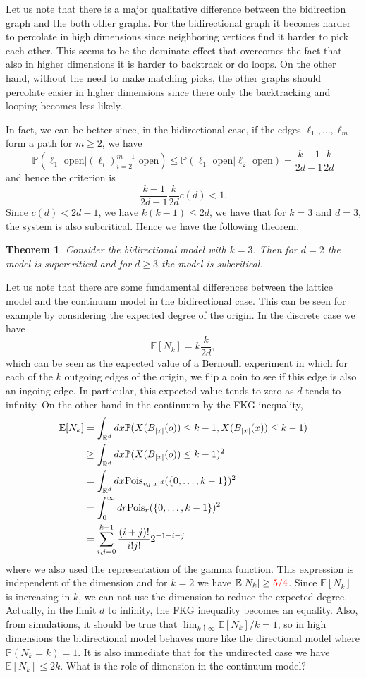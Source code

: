 \documentclass{article}
\newtheorem{theorem}{Theorem}[section]
\theoremstyle{definition}
\newcommand{\1}{\mathbbm{1}}
\newcommand{\0}{\mathbf{o}}
\begin{document}
Let us note that there is a major qualitative difference between the bidirection graph and the both other graphs. For the bidirectional graph it becomes harder to percolate in high dimensions since neighboring vertices find it harder to pick each other. This seems to be the dominate effect that overcomes the fact that also in higher dimensions it is harder to backtrack or do loops. On the other hand, without the need to make matching picks, the other graphs should percolate easier in higher dimensions since there only the backtracking and looping becomes less likely. 

In fact, we can be better since, in the bidirectional case, if the edges $\ell_1,\ldots,\ell_m$ form a path for $m \geq 2$, we have
$$
\mathbb P(\ell_1\text{ open}|(\ell_i)_{i=2}^{m-1} \text{ open})\le \mathbb P(\ell_1\text{ open}|\ell_2\text{ open})=\frac{k-1}{2d-1}\frac{k}{2d}
$$
and hence the criterion is
$$
\frac{k-1}{2d-1}\frac{k}{2d}c(d)<1.
$$
Since $c(d)<2d-1$, we have $k(k-1)\le 2d$, we have that for $k=3$ and $d=3$, the system is also subcritical. Hence we have the following theorem.
\begin{theorem}
Consider the bidirectional model with $k=3$. Then for $d=2$ the model is supercritical and for $d\ge 3$ the model is subcritical. 
\end{theorem}

Let us note that there are some fundamental differences between the lattice model and the continuum model in the bidirectional case. This can be seen for example by considering the expected degree of the origin. In the discrete case we have
$$
\mathbb E[N_k]=k\frac{k}{2d}, 
$$
which can be seen as the expected value of a Bernoulli experiment in which for each of the $k$ outgoing edges of the origin, we flip a coin to see if this edge is also an ingoing edge. In particular, this expected value tends to zero as $d$ tends to infinity. On the other hand in the continuum by the FKG inequality,
\begin{align*}
\mathbb E[N_k]&=\int_{\mathbb R^d}d x\mathbb P(X(B_{|x|}(o))\le k-1, X(B_{|x|}(x))\le k-1)\\
&\ge \int_{\mathbb R^d}d x\mathbb P(X(B_{|x|}(o))\le k-1)^2\\
&= \int_{\mathbb R^d}d x {\rm Pois}_{v_d|x|^d}(\{0,\dots,k-1\})^2\\
&= \int_0^\infty d r {\rm Pois}_{r}(\{0,\dots,k-1\})^2\\
&= \sum_{i,j=0}^{k-1}\frac{(i+j)!}{i!j!}2^{-1-i-j}
\end{align*}
where we also used the representation of the gamma function. This expression is independent of the dimension and for $k=2$ we have $\mathbb E[N_k]\ge \color{red} 5/4 \color{black}$. Since $\mathbb E[N_k]$ is increasing in $k$, we can not use the dimension to reduce the expected degree. Actually, in the limit $d$ to infinity, the FKG inequality becomes an equality. Also, from simulations, it should be true that $\lim_{k\uparrow\infty}\mathbb E[N_k]/k=1$, so in high dimensions the bidirectional model behaves more like the directional model where  $\mathbb P(N_k=k)=1$. It is also immediate that for the undirected case we have $\mathbb E[N_k]\le 2k$. What is the role of dimension in the continuum model?
\end{document}
